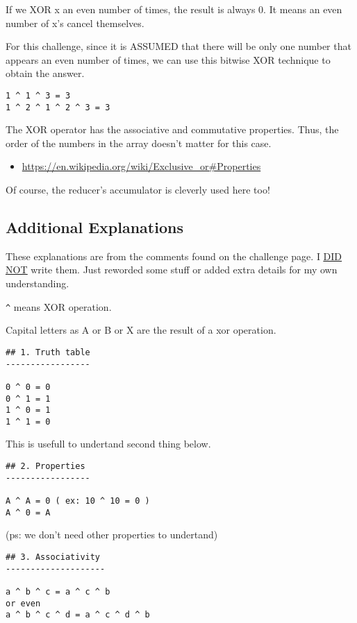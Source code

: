 \documentclass[11pt]{article}
\begin{document}
If we XOR x an even number of times, the result is always 0. It means an even number of x's cancel themselves.

For this challenge, since it is ASSUMED that there will be only one number that appears an even number of times, we can use this bitwise XOR technique to obtain the answer.

\begin{verbatim}
1 ^ 1 ^ 3 = 3
1 ^ 2 ^ 1 ^ 2 ^ 3 = 3
\end{verbatim}


The XOR operator has the associative and commutative properties. Thus, the order of the numbers in the array doesn't matter for this case.

\begin{itemize}
\item \url{https://en.wikipedia.org/wiki/Exclusive\_or\#Properties}
\end{itemize}

Of course, the reducer's accumulator is cleverly used here too!

\subsection{Additional Explanations}
\label{sec:orge8e5c32}

These explanations are from the comments found on the challenge page. I \uline{\uline{DID NOT}} write them. Just reworded some stuff or added extra details for my own understanding.

\texttt{\textasciicircum{}} means XOR operation.

Capital letters as A or B or X are the result of a xor operation.

\begin{verbatim}
## 1. Truth table
-----------------

0 ^ 0 = 0
0 ^ 1 = 1
1 ^ 0 = 1
1 ^ 1 = 0
\end{verbatim}


This is usefull to undertand second thing below.

\begin{verbatim}
## 2. Properties
-----------------

A ^ A = 0 ( ex: 10 ^ 10 = 0 )
A ^ 0 = A
\end{verbatim}


(ps: we don't need other properties to undertand)

\begin{verbatim}
## 3. Associativity
--------------------

a ^ b ^ c = a ^ c ^ b
or even
a ^ b ^ c ^ d = a ^ c ^ d ^ b
\end{verbatim}
\end{document}
